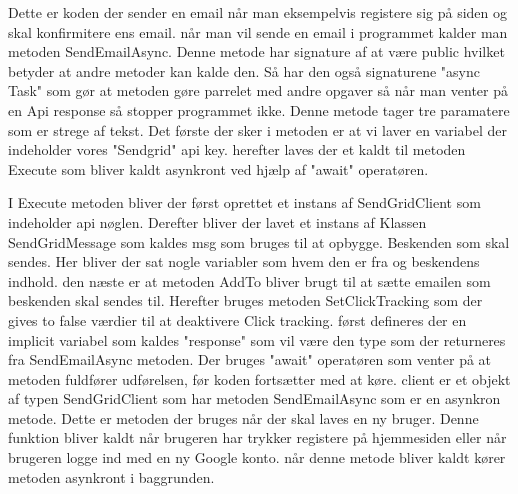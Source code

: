 Dette er koden der sender en email når man eksempelvis registere sig på siden og skal 
konfirmitere ens email. når man vil sende en email i programmet kalder man metoden SendEmailAsync.
Denne metode har signature af at være public hvilket betyder at andre metoder kan kalde den. Så har
den også signaturene "async Task" som gør at metoden gøre parrelet med andre opgaver så når man venter på
en Api response så stopper programmet ikke. Denne metode tager tre paramatere som er strege af tekst.
Det første der sker i metoden er at vi laver en variabel der indeholder vores "Sendgrid" api key.
herefter laves der et kaldt til metoden Execute som bliver kaldt asynkront ved hjælp af "await" operatøren.

I Execute metoden bliver der først oprettet et instans af SendGridClient som indeholder api nøglen.
Derefter bliver der lavet et instans af Klassen SendGridMessage som kaldes msg som bruges til at opbygge. 
Beskenden som skal sendes. Her bliver der sat nogle variabler som hvem den er fra og beskendens indhold. 
den næste er at metoden AddTo bliver brugt til at sætte emailen som beskenden skal sendes til. Herefter bruges metoden 
SetClickTracking som der gives to false værdier til at deaktivere Click tracking. først defineres der en implicit variabel 
som kaldes "response" som vil være den type som der returneres fra SendEmailAsync metoden. Der bruges "await" operatøren som venter
på at metoden fuldfører udførelsen, før koden fortsætter med at køre. client er et objekt af typen SendGridClient som har metoden
SendEmailAsync som er en asynkron metode.
\bigbreak
\noindent
Dette er metoden der bruges når der skal laves en ny bruger. Denne funktion bliver kaldt når brugeren har trykker registere på hjemmesiden eller
når brugeren logge ind med en ny Google konto. når denne metode bliver kaldt kører metoden asynkront i baggrunden.

